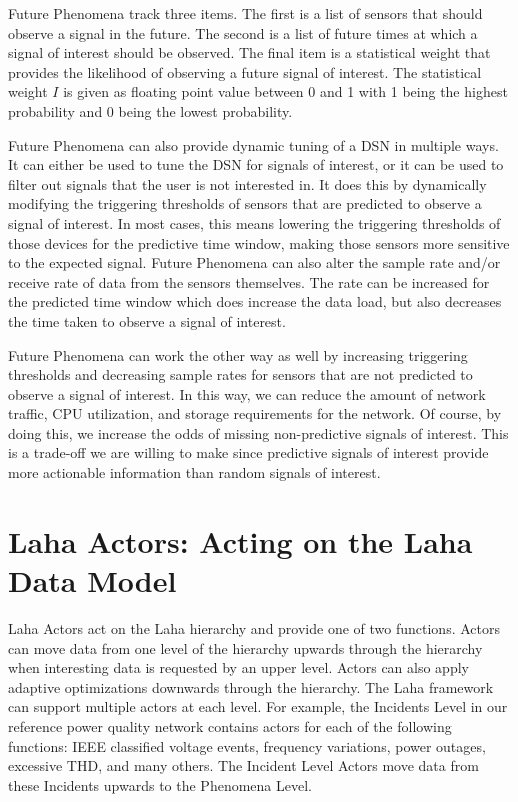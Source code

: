 Future Phenomena track three items. The first is a list of sensors that should observe a signal in the future. The second is a list of future times at which a signal of interest should be observed. The final item is a statistical weight that provides the likelihood of observing a future signal of interest. The statistical weight $I$ is given as floating point value between 0 and 1 with 1 being the highest probability and 0 being the lowest probability.

Future Phenomena can also provide dynamic tuning of a DSN in multiple ways. It can either be used to tune the DSN for signals of interest, or it can be used to filter out signals that the user is not interested in. It does this by dynamically modifying the triggering thresholds of sensors that are predicted to observe a signal of interest. In most cases, this means lowering the triggering thresholds of those devices for the predictive time window, making those sensors more sensitive to the expected signal. Future Phenomena can also alter the sample rate and/or receive rate of data from the sensors themselves. The rate can be increased for the predicted time window which does increase the data load, but also decreases the time taken to observe a signal of interest.

Future Phenomena can work the other way as well by increasing triggering thresholds and decreasing sample rates for sensors that are not predicted to observe a signal of interest. In this way, we can reduce the amount of network traffic, CPU utilization, and storage requirements for the network. Of course, by doing this, we increase the odds of missing non-predictive signals of interest. This is a trade-off we are willing to make since predictive signals of interest provide more actionable information than random signals of interest.


\section{Laha Actors: Acting on the Laha Data Model}\label{sec:laha-actors:-acting-on-the-laha-data-model}
Laha Actors act on the Laha hierarchy and provide one of two functions. Actors can move data from one level of the hierarchy upwards through the hierarchy when interesting data is requested by an upper level. Actors can also apply adaptive optimizations downwards through the hierarchy. The Laha framework can support multiple actors at each level. For example, the Incidents Level in our reference power quality network contains actors for each of the following functions: IEEE classified voltage events, frequency variations, power outages, excessive THD, and many others. The Incident Level Actors move data from these Incidents upwards to the Phenomena Level.

